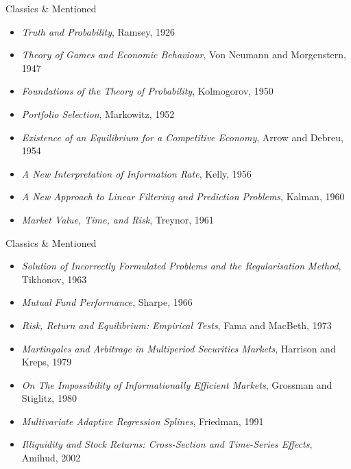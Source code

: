 \documentclass{beamer}
\begin{document}
\begin{frame}{Classics \& Mentioned}
	\begin{itemize}
		\item \textit{Truth and Probability}, Ramsey, 1926
		\item \textit{Theory of Games and Economic Behaviour}, Von Neumann and Morgenstern, 1947
		\item \textit{Foundations of the Theory of Probability}, Kolmogorov, 1950
		\item \textit{Portfolio Selection}, Markowitz, 1952
		\item \textit{Existence of an Equilibrium for a Competitive Economy}, Arrow and Debreu, 1954
		\item \textit{A New Interpretation of Information Rate}, Kelly, 1956
		\item \textit{A New Approach to Linear Filtering and Prediction Problems}, Kalman, 1960
		\item \textit{Market Value, Time, and Risk}, Treynor, 1961
	\end{itemize}
\end{frame}
\begin{frame}{Classics \& Mentioned}
	\begin{itemize}
		\item \textit{Solution of Incorrectly Formulated Problems and the Regularisation Method}, Tikhonov, 1963
		\item \textit{Mutual Fund Performance}, Sharpe, 1966
		\item \textit{Risk, Return and Equilibrium: Empirical Tests}, Fama and MacBeth, 1973
		\item \textit{Martingales and Arbitrage in Multiperiod Securities Markets}, Harrison and Kreps, 1979
		\item \textit{On The Impossibility of Informationally Efficient Markets}, Grossman and Stiglitz, 1980
		\item \textit{Multivariate Adaptive Regression Splines}, Friedman, 1991
		\item \textit{Illiquidity and Stock Returns: Cross-Section and Time-Series Effects}, Amihud, 2002
	\end{itemize}
\end{frame}
\end{document}
